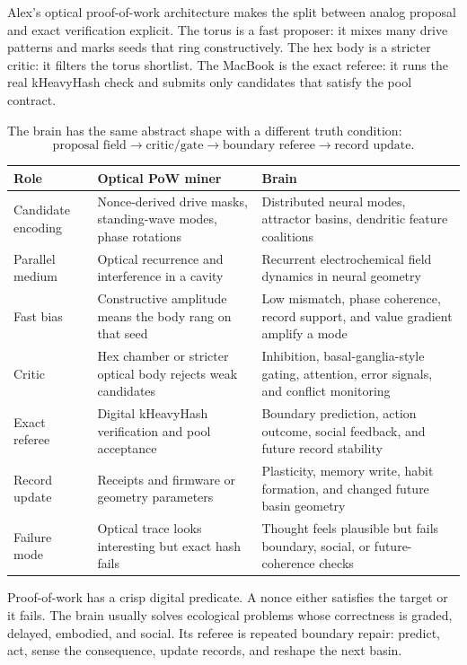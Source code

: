 \documentclass[11pt]{article}
\theoremstyle{remark}
\theoremstyle{plain}
\begin{document}
Alex's optical proof-of-work architecture makes the split between analog proposal and exact verification explicit. The torus is a fast proposer: it mixes many drive patterns and marks seeds that ring constructively. The hex body is a stricter critic: it filters the torus shortlist. The MacBook is the exact referee: it runs the real kHeavyHash check and submits only candidates that satisfy the pool contract.

The brain has the same abstract shape with a different truth condition:
\[
\boxed{
\text{proposal field}
\to
\text{critic/gate}
\to
\text{boundary referee}
\to
\text{record update}.
}
\]

\begin{longtable}{L{0.24\textwidth}L{0.34\textwidth}L{0.34\textwidth}}
\toprule
\textbf{Role} & \textbf{Optical PoW miner} & \textbf{Brain} \\
\midrule
\endhead
Candidate encoding & Nonce-derived drive masks, standing-wave modes, phase rotations & Distributed neural modes, attractor basins, dendritic feature coalitions \\
Parallel medium & Optical recurrence and interference in a cavity & Recurrent electrochemical field dynamics in neural geometry \\
Fast bias & Constructive amplitude means the body rang on that seed & Low mismatch, phase coherence, record support, and value gradient amplify a mode \\
Critic & Hex chamber or stricter optical body rejects weak candidates & Inhibition, basal-ganglia-style gating, attention, error signals, and conflict monitoring \\
Exact referee & Digital kHeavyHash verification and pool acceptance & Boundary prediction, action outcome, social feedback, and future record stability \\
Record update & Receipts and firmware or geometry parameters & Plasticity, memory write, habit formation, and changed future basin geometry \\
Failure mode & Optical trace looks interesting but exact hash fails & Thought feels plausible but fails boundary, social, or future-coherence checks \\
\bottomrule
\end{longtable}

Proof-of-work has a crisp digital predicate. A nonce either satisfies the target or it fails. The brain usually solves ecological problems whose correctness is graded, delayed, embodied, and social. Its referee is repeated boundary repair: predict, act, sense the consequence, update records, and reshape the next basin.
\end{document}
